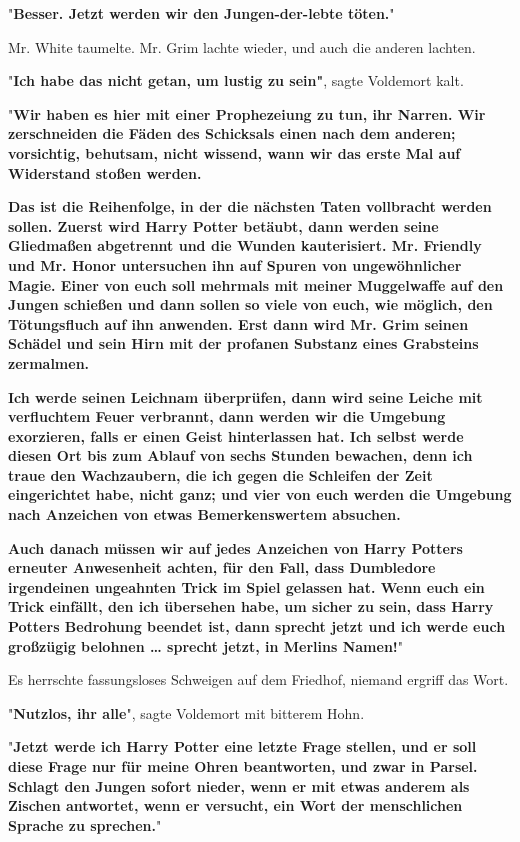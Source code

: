 {"\textbf{Besser. Jetzt werden wir den Jungen-der-lebte töten.}"

Mr. White taumelte. Mr. Grim lachte wieder, und auch die anderen lachten.

"\textbf{Ich habe das nicht getan, um lustig zu sein"}, sagte Voldemort kalt.

"\textbf{Wir haben es hier mit einer Prophezeiung zu tun, ihr Narren. Wir zerschneiden die Fäden des Schicksals einen nach dem anderen; vorsichtig, behutsam, nicht wissend, wann wir das erste Mal auf Widerstand stoßen werden.}

\textbf{\hfill\break Das ist die Reihenfolge, in der die nächsten Taten vollbracht werden sollen. Zuerst wird Harry Potter betäubt, dann werden seine Gliedmaßen abgetrennt und die Wunden kauterisiert. Mr. Friendly und Mr. Honor untersuchen ihn auf Spuren von ungewöhnlicher Magie. Einer von euch soll mehrmals mit meiner Muggelwaffe auf den Jungen schießen und dann sollen so viele von euch, wie möglich, den Tötungsfluch auf ihn anwenden. Erst dann wird Mr. Grim seinen Schädel und sein Hirn mit der profanen Substanz eines Grabsteins zermalmen.}

\textbf{\hfill\break Ich werde seinen Leichnam überprüfen, dann wird seine Leiche mit verfluchtem Feuer verbrannt, dann werden wir die Umgebung exorzieren, falls er einen Geist hinterlassen hat. Ich selbst werde diesen Ort bis zum Ablauf von sechs Stunden bewachen, denn ich traue den Wachzaubern, die ich gegen die Schleifen der Zeit eingerichtet habe, nicht ganz; und vier von euch werden die Umgebung nach Anzeichen von etwas Bemerkenswertem absuchen.}

\textbf{\hfill\break Auch danach müssen wir auf jedes Anzeichen von Harry Potters erneuter Anwesenheit achten, für den Fall, dass Dumbledore irgendeinen ungeahnten Trick im Spiel gelassen hat. Wenn euch ein Trick einfällt, den ich übersehen habe, um sicher zu sein, dass Harry Potters Bedrohung beendet ist, dann sprecht jetzt und ich werde euch großzügig belohnen … sprecht jetzt, in Merlins Namen!}"

Es herrschte fassungsloses Schweigen auf dem Friedhof, niemand ergriff das Wort.

"\textbf{Nutzlos, ihr alle}", sagte Voldemort mit bitterem Hohn.

"\textbf{Jetzt werde ich Harry Potter eine letzte Frage stellen, und er soll diese Frage nur für meine Ohren beantworten, und zwar in Parsel. Schlagt den Jungen sofort nieder, wenn er mit etwas anderem als Zischen antwortet, wenn er versucht, ein Wort der menschlichen Sprache zu sprechen.}"

}
